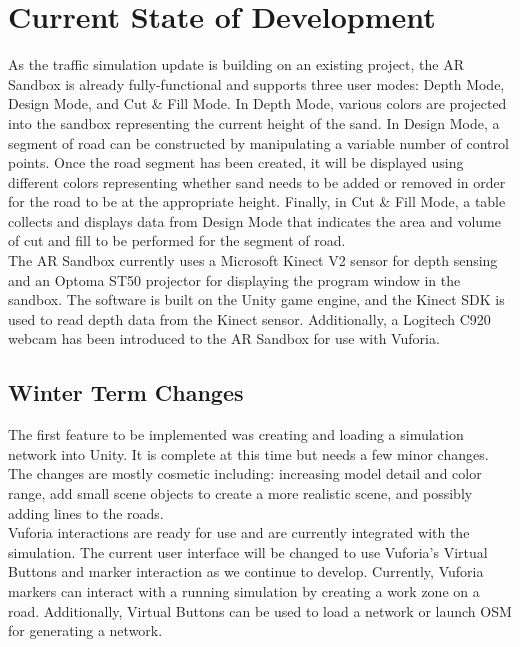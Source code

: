 \documentclass[letterpaper, 10pt, onecolumn, draftclsnofoot]{IEEEtran}
\begin{document}
\section{Current State of Development}
    As the traffic simulation update is building on an existing project, the AR Sandbox is already fully-functional and supports three user modes: Depth Mode, Design Mode, and Cut \& Fill Mode. In Depth Mode, various colors are projected into the sandbox representing the current height of the sand. In Design Mode, a segment of road can be constructed by manipulating a variable number of control points.\cite{OrgOSUSandbox} Once the road segment has been created, it will be displayed using different colors representing whether sand needs to be added or removed in order for the road to be at the appropriate height. Finally, in Cut \& Fill Mode, a table collects and displays data from Design Mode that indicates the area and volume of cut and fill to be performed for the segment of road.\\
    
    The AR Sandbox currently uses a Microsoft Kinect V2 sensor for depth sensing and an Optoma ST50 projector for displaying the program window in the sandbox. The software is built on the Unity game engine, and the Kinect SDK is used to read depth data from the Kinect sensor. Additionally, a Logitech C920 webcam has been introduced to the AR Sandbox for use with Vuforia.
    
    \subsection{Winter Term Changes}
        The first feature to be implemented was creating and loading a simulation network into Unity. It is complete at this time but needs a few minor changes. The changes are mostly cosmetic including: increasing model detail and color range, add small scene objects to create a more realistic scene, and possibly adding lines to the roads.\\
        
        Vuforia interactions are ready for use and are currently integrated with the simulation. The current user interface will be changed to use Vuforia's Virtual Buttons and marker interaction as we continue to develop. Currently, Vuforia markers can interact with a running simulation by creating a work zone on a road. Additionally, Virtual Buttons can be used to load a network or launch OSM for generating a network.\\
        
\end{document}

